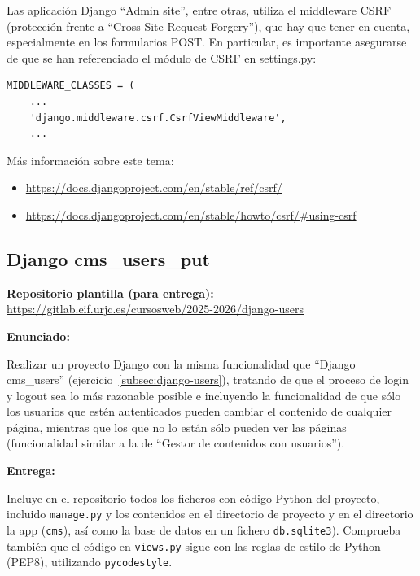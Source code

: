 Las aplicación Django ``Admin site'', entre otras, utiliza el middleware CSRF (protección frente a ``Cross Site Request Forgery''), que hay que tener en cuenta, especialmente en los formularios POST. En particular, es importante asegurarse de que se han referenciado el módulo de CSRF en settings.py:

\begin{verbatim}
MIDDLEWARE_CLASSES = (
    ...
    'django.middleware.csrf.CsrfViewMiddleware',
    ...
\end{verbatim}

Más información sobre este tema: \\

\begin{itemize}
\item \url{https://docs.djangoproject.com/en/stable/ref/csrf/}
\item \url{https://docs.djangoproject.com/en/stable/howto/csrf/#using-csrf}
\end{itemize}

\subsection{Django cms\_users\_put}
\label{subsec:django-users-put}

\textbf{Repositorio plantilla (para entrega):} \\
\url{https://gitlab.eif.urjc.es/cursosweb/2025-2026/django-users}

\textbf{Enunciado:}

Realizar un proyecto Django con la misma funcionalidad que ``Django cms\_users'' (ejercicio~\ref{subsec:django-users}), tratando de que el proceso de login y logout sea lo más razonable posible e incluyendo la funcionalidad de que sólo los usuarios que estén autenticados pueden cambiar el contenido de cualquier página, mientras que los que no lo están sólo pueden ver las páginas (funcionalidad similar a la de ``Gestor de contenidos con usuarios'').

\textbf{Entrega:}

Incluye en el repositorio todos los ficheros con código Python del proyecto, incluido \texttt{manage.py} y los contenidos en el directorio de proyecto y en el directorio la app (\texttt{cms}), así como la base de datos en un fichero \texttt{db.sqlite3}). Comprueba también que el código en \texttt{views.py} sigue con las reglas de estilo de Python (PEP8), utilizando \texttt{pycodestyle}.


